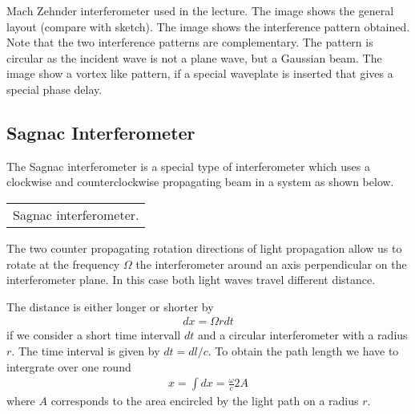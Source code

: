 \documentclass[letterpaper,10pt,english]{sphinxmanual}
\begin{document}
  



 Mach Zehnder interferometer used in the lecture. The  image shows the general layout (compare with sketch). The  image shows the interference pattern obtained. Note that the two interference patterns are complementary. The pattern is circular as the incident wave is not a plane wave, but a Gaussian beam. The  image show a vortex like pattern, if a special waveplate is inserted that gives a special phase delay.






\subsection{Sagnac Interferometer}
\label{\detokenize{notebooks/L9/Interference:Sagnac-Interferometer}}
The Sagnac interferometer is a special type of interferometer which uses a clockwise and counter\sphinxhyphen{}clockwise propagating beam in a system as shown below.


\begin{savenotes}\sphinxattablestart
\centering
\begin{tabulary}{\linewidth}[t]{|T|}
\hline
\sphinxstyletheadfamily 
{}
\\
\hline
{} Sagnac interferometer.
\\
\hline
\end{tabulary}
\par
\sphinxattableend\end{savenotes}

The two counter propagating rotation directions of light propagation allow us to rotate at the frequency \(\Omega\) the interferometer around an axis perpendicular on the interferometer plane. In this case both light waves travel different distance.

The distance is either longer or shorter by
\begin{equation*}
\begin{split}dx=\Omega r dt\end{split}
\end{equation*}
if we consider a short time intervall \(dt\) and a circular interferometer with a radius \(r\). The time interval is given by \(dt=dl/c\). To obtain the path length we have to intergrate over one round
\begin{equation*}
\begin{split}x=\int dx = \frac{\omega}{c}2A\end{split}
\end{equation*}
where \(A\) corresponds to the area encircled by the light path on a radius \(r\).
\end{document}
